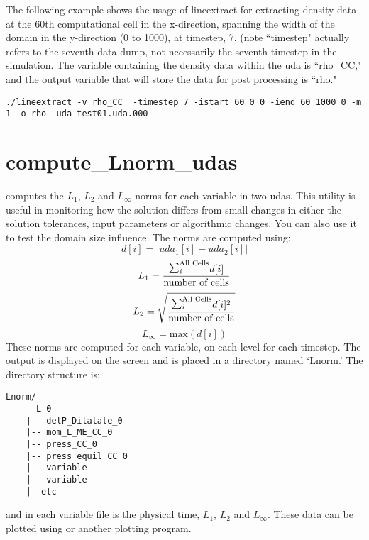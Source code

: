 The following example shows the usage of lineextract for extracting
density data at the 60th computational cell in the x-direction,
spanning the width of the domain in the y-direction (0 to 1000), at
timestep, 7, (note ``timestep" actually refers to the seventh data
dump, not necessarily the seventh timestep in the simulation. The
variable containing the density data within the uda is ``rho\_CC," and
the output variable that will store the data for post processing is
``rho."
\begin{Verbatim}[fontsize=\footnotesize]
./lineextract -v rho_CC  -timestep 7 -istart 60 0 0 -iend 60 1000 0 -m 1 -o rho -uda test01.uda.000
\end{Verbatim}

\section{compute\_Lnorm\_udas}
 computes the $L_1$, $L_2$ and $L_\infty$
norms for each variable in two udas.  This utility is useful in
monitoring how the solution differs from small changes in either the
solution tolerances, input parameters or algorithmic changes.  You can
also use it to test the domain size influence.  The norms are computed
using:
%
\begin{equation}
  d[i] = |uda_1[i] - uda_2[i]|
\end{equation}
%
\begin{equation}
  L_1 = \frac{\raise1.5pt\hbox{$\sum_i^\text{All Cells}$}d[i]}{\text{number of cells}}
\end{equation}
%
\begin{equation}
  L_2 = \sqrt{ \frac{\raise1.5pt\hbox{$\sum_i^\text{All Cells}$}d[i]^2}{\text{number of cells}} }
\end{equation}
%
\begin{equation}
  L_\infty = \text{max}(d[i])
\end{equation}
%
These norms are computed for each 
variable, on each level for each timestep.  The output is displayed on
the screen and is placed in a directory named `Lnorm.'  The directory
structure is:
%
\begin{Verbatim}[fontsize=\footnotesize]
 Lnorm/
   -- L-0
    |-- delP_Dilatate_0
    |-- mom_L_ME_CC_0
    |-- press_CC_0
    |-- press_equil_CC_0
    |-- variable
    |-- variable
    |--etc
\end{Verbatim}
%
and in each variable file is the physical time, $L_1$, $L_2$ and $L_\infty.$  These data can be plotted using  or another plotting program.

